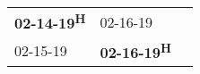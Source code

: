 \begin{supertabular}{lll}
 \textbf{02-14-19\textsuperscript{H}} &            02-16-19\textsuperscript{} \\
           02-15-19\textsuperscript{} &  \textbf{02-16-19\textsuperscript{H}} \\
\end{supertabular}
